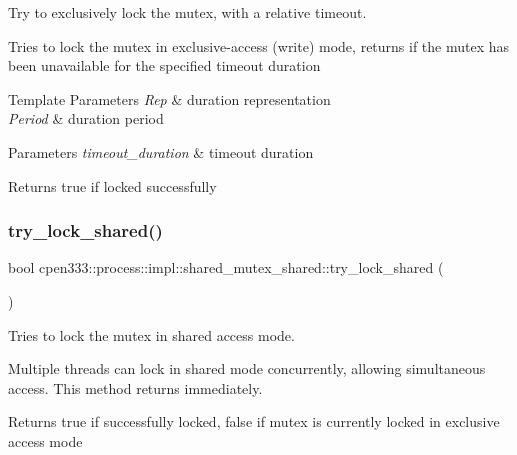 Try to exclusively lock the mutex, with a relative timeout. 

Tries to lock the mutex in exclusive-\/access (write) mode, returns if the mutex has been unavailable for the specified timeout duration


\begin{DoxyTemplParams}{Template Parameters}
{\em Rep} & duration representation \\
\hline
{\em Period} & duration period \\
\hline
\end{DoxyTemplParams}

\begin{DoxyParams}{Parameters}
{\em timeout\+\_\+duration} & timeout duration \\
\hline
\end{DoxyParams}
\begin{DoxyReturn}{Returns}
true if locked successfully 
\end{DoxyReturn}
\mbox{\label{classcpen333_1_1process_1_1impl_1_1shared__mutex__shared_a382dfc90cc323e70879de8e69bcb7e24}} 
\subsubsection{\texorpdfstring{try\+\_\+lock\+\_\+shared()}{try\_lock\_shared()}}
{\footnotesize\ttfamily bool cpen333\+::process\+::impl\+::shared\+\_\+mutex\+\_\+shared\+::try\+\_\+lock\+\_\+shared (\begin{DoxyParamCaption}{ }\end{DoxyParamCaption})\hspace{0.3cm}{\ttfamily [inline]}}



Tries to lock the mutex in shared access mode. 

Multiple threads can lock in shared mode concurrently, allowing simultaneous access. This method returns immediately.

\begin{DoxyReturn}{Returns}
true if successfully locked, false if mutex is currently locked in exclusive access mode 
\end{DoxyReturn}
\mbox{\label{classcpen333_1_1process_1_1impl_1_1shared__mutex__shared_a14203d4013d62fed7e1a8904c0db3793}} 
